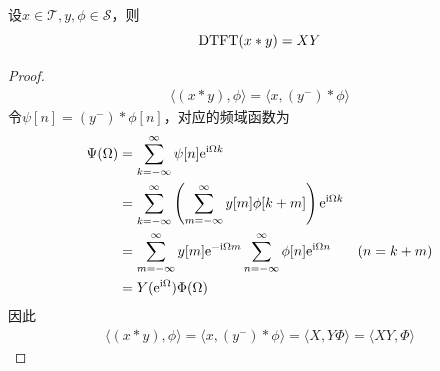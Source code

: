 \begin{theorem}[时域卷积定理]
    设$x\in\mathcal{T},y,\phi\in\mathcal{S}$，则
    $$\operatorname{DTFT}(x*y)=XY$$
\end{theorem}
\begin{proof}
    \begin{align*}
        \langle(x*y),\phi\rangle=\langle x,(y^-)*\phi\rangle
    \end{align*}
    令$\psi[n]=(y^-)*\phi[n]$，对应的频域函数为
    \begin{align*}
        \Psi(\Omega) & =\sum_{k=-\infty}^\infty \psi[n]\mathrm{e}^{\mathrm{i}\Omega k}                                                         \\
                     & =\sum_{k=-\infty}^\infty \left(\sum_{m=-\infty}^\infty y[m]\phi[k+m]\right)\mathrm{e}^{\mathrm{i}\Omega k}              \\
                     & =\sum_{m=-\infty}^\infty y[m]\mathrm{e}^{-\mathrm{i}\Omega m}\sum_{n=-\infty}^\infty \phi[n]\mathrm{e}^{\mathrm{i} \Omega n} & (n=k+m) \\
                     & =Y(\mathrm{e}^{\mathrm{i}\Omega})\Phi(\Omega)
    \end{align*}
    因此\begin{align*}
        \langle(x*y),\phi\rangle=\langle x,(y^-)*\phi\rangle=\langle X,Y\Phi\rangle=\langle XY,\Phi\rangle
    \end{align*}
\end{proof}

